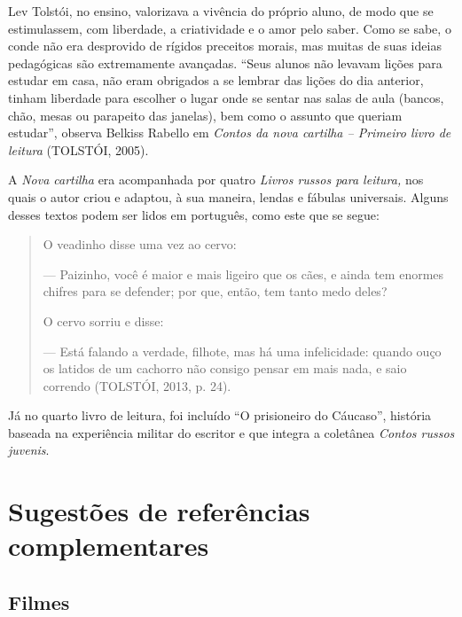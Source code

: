 \documentclass[11pt]{extarticle}
\begin{document}
Lev Tolstói, no ensino, valorizava a vivência do próprio aluno, de modo
que se estimulassem, com liberdade, a criatividade e o amor pelo saber.
Como se sabe, o conde não era desprovido de rígidos preceitos morais,
mas muitas de suas ideias pedagógicas são extremamente avançadas. ``Seus
alunos não levavam lições para estudar em casa, não eram obrigados a se
lembrar das lições do dia anterior, tinham liberdade para escolher o
lugar onde se sentar nas salas de aula (bancos, chão, mesas ou parapeito
das janelas), bem como o assunto que queriam estudar'', observa Belkiss
Rabello em \emph{Contos da nova cartilha -- Primeiro livro de leitura}
(TOLSTÓI, 2005).

A \emph{Nova cartilha} era acompanhada por quatro \emph{Livros russos
para leitura,} nos quais o autor criou e adaptou, à sua maneira, lendas
e fábulas universais. Alguns desses textos podem ser lidos em português,
como este que se segue:

\begin{quote}
O veadinho disse uma vez ao cervo:

--- Paizinho, você é maior e mais ligeiro que os cães, e ainda tem
enormes chifres para se defender; por que, então, tem tanto medo deles?

O cervo sorriu e disse:

--- Está falando a verdade, filhote, mas há uma infelicidade: quando
ouço os latidos de um cachorro não consigo pensar em mais nada, e saio
correndo (TOLSTÓI, 2013, p. 24).
\end{quote}

Já no quarto livro de leitura, foi incluído ``O prisioneiro do
Cáucaso'', história baseada na experiência militar do escritor e que
integra a coletânea \emph{Contos russos juvenis}.

\section{Sugestões de referências complementares}

\subsection{Filmes}
\end{document}
